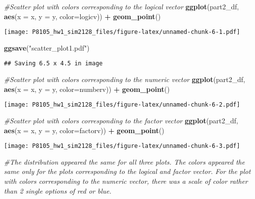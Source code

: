 \documentclass[]{article}
\newenvironment{Shaded}{\begin{snugshade}}{\end{snugshade}}
\newcommand{\CommentTok}[1]{\textcolor[rgb]{0.56,0.35,0.01}{\textit{#1}}}
\newcommand{\DataTypeTok}[1]{\textcolor[rgb]{0.13,0.29,0.53}{#1}}
\newcommand{\KeywordTok}[1]{\textcolor[rgb]{0.13,0.29,0.53}{\textbf{#1}}}
\newcommand{\NormalTok}[1]{#1}
\newcommand{\OperatorTok}[1]{\textcolor[rgb]{0.81,0.36,0.00}{\textbf{#1}}}
\newcommand{\StringTok}[1]{\textcolor[rgb]{0.31,0.60,0.02}{#1}}
\begin{document}
\begin{Shaded}
\begin{Highlighting}[]
\CommentTok{#Scatter plot with colors corresponding to the logical vector}
\KeywordTok{ggplot}\NormalTok{(part2_df, }\KeywordTok{aes}\NormalTok{(}\DataTypeTok{x =}\NormalTok{ x, }\DataTypeTok{y =}\NormalTok{ y, }\DataTypeTok{color=}\NormalTok{logicv)) }\OperatorTok{+}\StringTok{ }\KeywordTok{geom_point}\NormalTok{()}
\end{Highlighting}
\end{Shaded}

\texttt{[image: P8105\_hw1\_sim2128\_files/figure-latex/unnamed-chunk-6-1.pdf]}

\begin{Shaded}
\begin{Highlighting}[]
\KeywordTok{ggsave}\NormalTok{(}\StringTok{"scatter_plot1.pdf"}\NormalTok{)}
\end{Highlighting}
\end{Shaded}

\begin{verbatim}
## Saving 6.5 x 4.5 in image
\end{verbatim}

\begin{Shaded}
\begin{Highlighting}[]
\CommentTok{#Scatter plot with colors corresponding to the numeric vector}
\KeywordTok{ggplot}\NormalTok{(part2_df, }\KeywordTok{aes}\NormalTok{(}\DataTypeTok{x =}\NormalTok{ x, }\DataTypeTok{y =}\NormalTok{ y, }\DataTypeTok{color=}\NormalTok{numberv)) }\OperatorTok{+}\StringTok{ }\KeywordTok{geom_point}\NormalTok{()}
\end{Highlighting}
\end{Shaded}

\texttt{[image: P8105\_hw1\_sim2128\_files/figure-latex/unnamed-chunk-6-2.pdf]}

\begin{Shaded}
\begin{Highlighting}[]
\CommentTok{#Scatter plot with colors corresponding to the factor vector}
\KeywordTok{ggplot}\NormalTok{(part2_df, }\KeywordTok{aes}\NormalTok{(}\DataTypeTok{x =}\NormalTok{ x, }\DataTypeTok{y =}\NormalTok{ y, }\DataTypeTok{color=}\NormalTok{factorv)) }\OperatorTok{+}\StringTok{ }\KeywordTok{geom_point}\NormalTok{()}
\end{Highlighting}
\end{Shaded}

\texttt{[image: P8105\_hw1\_sim2128\_files/figure-latex/unnamed-chunk-6-3.pdf]}

\begin{Shaded}
\begin{Highlighting}[]
\CommentTok{#The distribution appeared the same for all three plots. The colors appeared the same only for the plots corresponding to the logical and factor vector. For the plot with colors corresponding to the numeric vector, there was a scale of color rather than 2 single options of red or blue. }
\end{Highlighting}
\end{Shaded}
\end{document}
